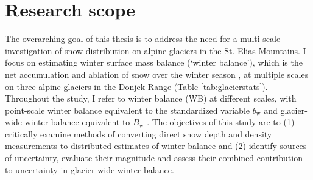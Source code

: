 \documentclass{sfuthesis}
\begin{document}
\section{Research scope}
\label{sec:ResearchScope}
The overarching goal of this thesis is to address the need for a multi-scale investigation of snow distribution on alpine glaciers in the St. Elias Mountains. I focus on estimating winter surface mass balance (`winter balance'), which is the net accumulation and ablation of snow over the winter season \citep{Cogley2011}, at multiple scales on three alpine glaciers in the Donjek Range (Table \ref{tab:glacierstats}).  Throughout the study, I refer to winter balance (WB) at different scales, with point-scale winter balance equivalent to the standardized variable $b_\mathrm{w}$ and glacier-wide winter balance equivalent to $B_\mathrm{w}$ \citep{Cogley2011}. The objectives of this study are to (1) critically examine methods of converting direct snow depth and density measurements to distributed estimates of winter balance and (2) identify sources of uncertainty, evaluate their magnitude and assess their combined contribution to uncertainty in glacier-wide winter balance. 
\end{document}
